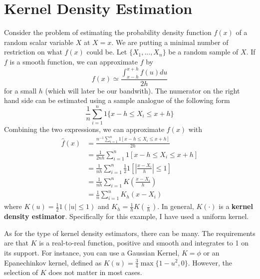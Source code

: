 \section{Kernel Density Estimation}
Consider the problem of estimating the probability density function $f(x)$ of a random scalar variable $X$ at $X=x$. We are putting a minimal number of restriction on what $f(x)$ could be. Let $\{X_1,...,X_n\}$ be a random sample of $X$. If $f$ is a smooth function, we can approximate $f$ by
\[
f(x)\simeq \frac{\int_{x-h}^{x+h}f(u)du}{2h}
\]
for a small $h$ (which will later be our bandwith). The numerator on the right hand side can be estimated using a sample analogue of the following form
\[
\frac{1}{n}\sum_{i=1}^n 1\{x-h\leq X_i \leq x+h \}
\]
Combining the two expressions, we can approximate $f(x)$ with
\footnotesize{\begin{align*}
\hat{f}(x)&=\frac{n^{-1}\sum_{i=1}^n 1[x-h\leq X_i \leq x+h]}{2h} \\
&=\frac{1}{2nh}\sum_{i=1}^n 1[x-h\leq X_i \leq x+h]\\
&=\frac{1}{nh}\sum_{i=1}^n \frac{1}{2}1\left[\left|\frac{x-X_i}{h}\right| \leq 1\right]\\
&=\frac{1}{nh}\sum_{i=1}^n K\left(\frac{x-X_i}{h}\right)\\
&=\frac{1}{n}\sum_{i=1}^n K_h(x-X_i)
\end{align*}}\normalsize
where $K(u)=\frac{1}{2}1(|u|\leq 1)$ and $K_h = \frac{1}{h}K\left(\frac{\cdot}{h}\right)$. In general, $K(\cdot)$ is a \textbf{kernel density estimator}. Specifically for this example, I have used a uniform kernel. \par
As for the type of kernel density estimators, there can be many. The requirements are that $K$ is a real-to-real function, positive and smooth and integrates to 1 on its support. For instance, you can use a Gaussian Kernel, $K=\phi$ or an Epanechinkov kernel, defined as $K(u)=\frac{3}{4}\max\{1-u^2,0\}$. However, the selection of $K$ does not matter in most cases. 
